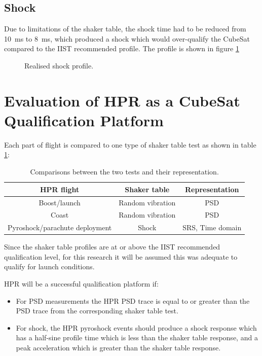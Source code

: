 \documentclass{report}
\begin{document}
\subsection{Shock}

Due to limitations of the shaker table, the shock time had to be reduced from \SI{10}{\milli\second} to \SI{8}{\milli\second}, which produced a shock which would over-qualify the CubeSat compared to the IIST recommended profile. The profile is shown in figure \ref{fig:shock-table-profile}

\begin{figure}[H]
  \centering
  
  \caption{Realised shock profile.}
  \label{fig:shock-table-profile}
\end{figure}

\section{Evaluation of HPR as a CubeSat Qualification Platform}

Each part of flight is compared to one type of shaker table test as shown in table \ref{tabl:compare-tests}:

\begin{table}[H]
  \centering
  \begin{tabular}{|c|c|c|}
    \hline
    \textbf{HPR flight}            & \textbf{Shaker table} & \textbf{Representation} \\\hline
    Boost/launch                   & Random vibration      & PSD                     \\\hline
    Coast                          & Random vibration      & PSD                     \\\hline
    Pyroshock/parachute deployment & Shock                 & SRS, Time domain        \\\hline
  \end{tabular}
  \caption{Comparisons between the two tests and their representation.}
  \label{tabl:compare-tests}
\end{table}

Since the shaker table profiles are at or above the IIST recommended qualification level, for this research it will be assumed this was adequate to qualify for launch conditions.

HPR will be a successful qualification platform if:
\begin{itemize}
  \item For PSD measurements the HPR PSD trace is equal to or greater than the PSD trace from the corresponding shaker table test.
  \item For shock, the HPR pyroshock events should produce a shock response which has a half-sine profile time which is less than the shaker table response, and a peak acceleration which is greater than the shaker table response.
\end{itemize}
\end{document}
